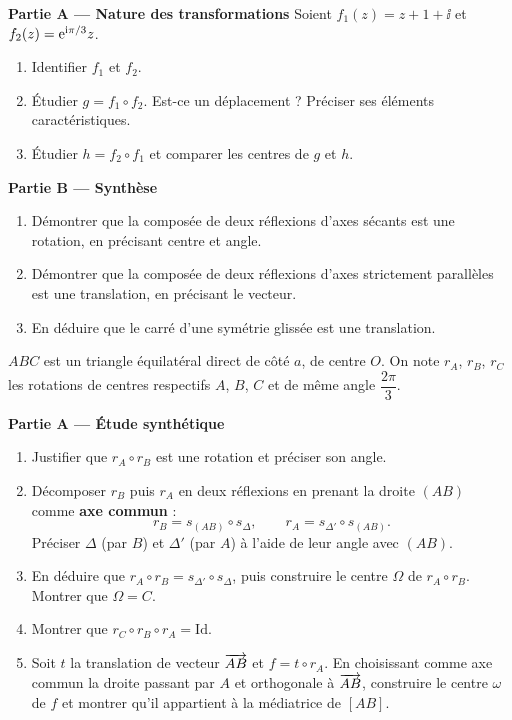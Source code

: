\textbf{Partie A — Nature des transformations}
Soient $f_1(z) = z + 1 + \ii$ et $f_2(z) = \mathrm{e}^{\mathrm{i}\pi/3}z$.
\begin{enumerate}
	\item Identifier $f_1$ et $f_2$.
	\item Étudier $g = f_1\circ f_2$. Est-ce un déplacement ? Préciser ses
	éléments caractéristiques.
	\item Étudier $h = f_2\circ f_1$ et comparer les centres de $g$ et $h$.
\end{enumerate}
\textbf{Partie B — Synthèse}
\begin{enumerate}
	\item Démontrer que la composée de deux réflexions d'axes sécants est une
	rotation, en précisant centre et angle.
	\item Démontrer que la composée de deux réflexions d'axes strictement
	parallèles est une translation, en précisant le vecteur.
	\item En déduire que le carré d'une symétrie glissée est une translation.
\end{enumerate}


$ABC$ est un triangle équilatéral direct de côté $a$, de centre $O$. On note
$r_A$, $r_B$, $r_C$ les rotations de centres respectifs $A$, $B$, $C$ et de
même angle $\dfrac{2\pi}{3}$.

\textbf{Partie A — Étude synthétique}
\begin{enumerate}
	\item Justifier que $r_A\circ r_B$ est une rotation et préciser son angle.
	\item Décomposer $r_B$ puis $r_A$ en deux réflexions en prenant la droite
	$(AB)$ comme \textbf{axe commun} :
	$$
	r_B = s_{(AB)}\circ s_{\Delta},\qquad r_A = s_{\Delta'}\circ s_{(AB)}.
	$$
	Préciser $\Delta$ (par $B$) et $\Delta'$ (par $A$) à l'aide de leur angle
	avec $(AB)$.
	\item En déduire que $r_A\circ r_B = s_{\Delta'}\circ s_{\Delta}$, puis
	construire le centre $\Omega$ de $r_A\circ r_B$. Montrer que $\Omega=C$.
	\item Montrer que $r_C\circ r_B\circ r_A = \mathrm{Id}$.
	\item Soit $t$ la translation de vecteur $\overrightarrow{AB}$ et $f = t\circ r_A$.
	En choisissant comme axe commun la droite passant par $A$ et orthogonale à
	$\overrightarrow{AB}$, construire le centre $\omega$ de $f$ et montrer qu'il
	appartient à la médiatrice de $[AB]$.
\end{enumerate}

